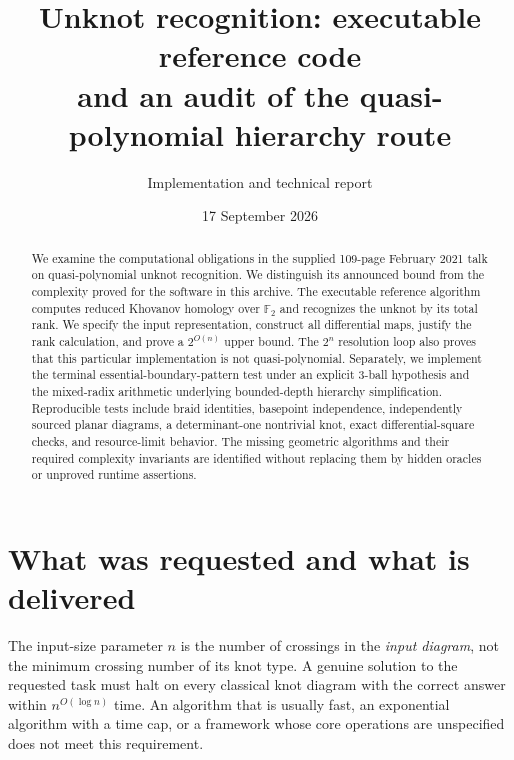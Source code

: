 \documentclass[11pt]{article}
\title{Unknot recognition: executable reference code\\
       and an audit of the quasi-polynomial hierarchy route}
\author{Implementation and technical report}
\date{17 September 2026}
\theoremstyle{definition}
\newcommand{\F}{\mathbb F_2}
\begin{document}
\maketitle
\begin{center}
\end{center}

\begin{abstract}
We examine the computational obligations in the supplied 109-page February
2021 talk on quasi-polynomial unknot recognition. We distinguish its announced
bound from the complexity proved for the software in this archive. The
executable reference algorithm computes reduced Khovanov homology over
$\F$ and recognizes the unknot by its total rank. We specify the input
representation, construct all differential maps, justify the rank calculation,
and prove a $2^{O(n)}$ upper bound. The $2^n$ resolution loop also proves that
this particular implementation is not quasi-polynomial. Separately, we
implement the terminal essential-boundary-pattern test under an explicit
3-ball hypothesis and the mixed-radix arithmetic underlying bounded-depth
hierarchy simplification. Reproducible tests include braid identities,
basepoint independence, independently sourced planar diagrams, a
determinant-one nontrivial knot, exact differential-square checks, and
resource-limit behavior. The missing geometric algorithms and their required
complexity invariants are identified without replacing them by hidden
oracles or unproved runtime assertions.
\end{abstract}

\section{What was requested and what is delivered}
The input-size parameter $n$ is the number of crossings in the \emph{input
diagram}, not the minimum crossing number of its knot type. A genuine solution
to the requested task must halt on every classical knot diagram with the
correct answer within $n^{O(\log n)}$ time. An algorithm that is usually fast,
an exponential algorithm with a time cap, or a framework whose core operations
are unspecified does not meet this requirement.
\end{document}
